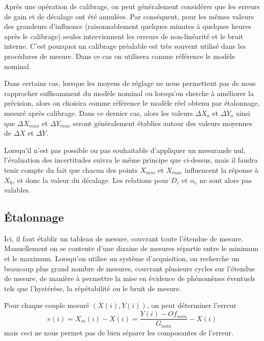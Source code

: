 Après une opération de calibrage, on peut généralement considérer que les erreurs de gain et de décalage ont été annulées. Par conséquent, pour les mêmes valeurs des grandeurs d'influence (raisonnablement quelques minutes à quelques heures après le calibrage) seules interviennent les erreurs de non-linéarité et le bruit interne. C'est pourquoi un calibrage préalable est très souvent utilisé dans les procédures de mesure. Dans ce cas on utilisera comme référence le modèle nominal.

Dans certains cas, lorsque les moyens de réglage ne nous permettent pas de nous rapprocher suffisamment du modèle nominal ou lorsqu'on cherche à améliorer la précision, alors on choisira comme référence le modèle réel obtenu par étalonnage, mesuré après calibrage. Dans ce dernier cas, alors les valeurs $\Delta X_{o}$ et $\Delta Y_{o}$ ainsi que $\Delta X_{max}$ et $\Delta Y_{max}$ seront généralement établies autour des valeurs moyennes de $\Delta X$ et $\Delta Y$.

Lorsqu'il n'est pas possible ou pas souhaitable d'appliquer un mesurande nul, l'évaluation des incertitudes suivra le même principe que ci-dessus, mais il faudra tenir compte du fait que chacun des points $X_{min}$ et $X_{max}$ influencent la réponse à $X_{0}$, et donc la valeur du décalage. Les relations pour $D_{c}$ et $\alpha_{c}$ ne sont alors pas valables.

\subsection{Étalonnage}

Ici, il faut établir un tableau de mesure, couvrant toute l'étendue de mesure. Manuellement on se contente d'une dizaine de mesures répartie entre le minimum et le maximum. Lorsqu'on utilise un système d'acquisition, on recherche un beaucoup plus grand nombre de mesures, couvrant plusieurs cycles sur l'étendue de mesure, de manière à permettre la mise en évidence de phénomènes éventuels tels que l'hystérèse, la répétabilité ou le bruit de mesure.

Pour chaque couple mesuré $(X(i), Y(i))$, on peut déterminer l'erreur
\[
    e(i) = X_m(i) - X(i) = \frac{Y(i) - Of_{nom}}{G_{nom}}   -X(i)
\]
mais ceci ne nous permet pas de bien séparer les composantes de l'erreur.

